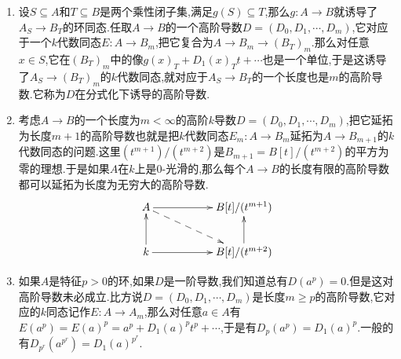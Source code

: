 \begin{enumerate}
\begin{proof}
	    于是$E\circ E'$对应的高阶导数$D''=(D_0'',D_1'',\cdots,D_m'')$就满足$D_i''=\sum_{p+q=i}D_pD_q'$.另外如果要解逆元,就是解$\sum_{p+q=i}D_pD_q^*,i\ge1$.
	\end{proof}
    \item 设$S\subseteq A$和$T\subseteq B$是两个乘性闭子集,满足$g(S)\subseteq T$,那么$g:A\to B$就诱导了$A_S\to B_T$的环同态.任取$A\to B$的一个高阶导数$D=(D_0,D_1,\cdots,D_m)$,它对应于一个$k$代数同态$E:A\to B_m$,把它复合为$A\to B_m\to (B_T)_m$.那么对任意$x\in S$,它在$(B_T)_m$中的像$g(x)_T+D_1(x)_Tt+\cdots$也是一个单位,于是这诱导了$A_S\to(B_T)_m$的$k$代数同态,就对应于$A_S\to B_T$的一个长度也是$m$的高阶导数.它称为$D$在分式化下诱导的高阶导数.
    \item 考虑$A\to B$的一个长度为$m<\infty$的高阶$k$导数$D=(D_0,D_1,\cdots,D_m)$,把它延拓为长度$m+1$的高阶导数也就是把$k$代数同态$E_m:A\to B_m$延拓为$A\to B_{m+1}$的$k$代数同态的问题.这里$(t^{m+1})/(t^{m+2})$是$B_{m+1}=B[t]/(t^{m+2})$的平方为零的理想.于是如果$A$在$k$上是0-光滑的,那么每个$A\to B$的长度有限的高阶导数都可以延拓为长度为无穷大的高阶导数.
    $$\xymatrix{A\ar[rr]\ar@{-->}[drr]&&B[t]/(t^{m+1})\\k\ar[u]\ar[rr]&&B[t]/(t^{m+2})\ar[u]}$$
    \item 如果$A$是特征$p>0$的环,如果$D$是一阶导数,我们知道总有$D(a^p)=0$.但是这对高阶导数未必成立.比方说$D=(D_0,D_1,\cdots,D_m)$是长度$m\ge p$的高阶导数,它对应的$k$同态记作$E:A\to A_m$,那么对任意$a\in A$有$E(a^p)=E(a)^p=a^p+D_1(a)^pt^p+\cdots$,于是有$D_p(a^p)=D_1(a)^p$.一般的有$D_{p^r}(a^{p^r})=D_1(a)^{p^r}$.
\end{enumerate}

